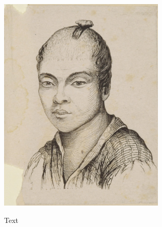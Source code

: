\begin{center}
\includegraphics[width=80mm]{./content/img/daisuke.jpg}
\begin{figure}[h]
\end{figure}
\end{center}

\noindent 

Text

\smallskip



\clearpage


